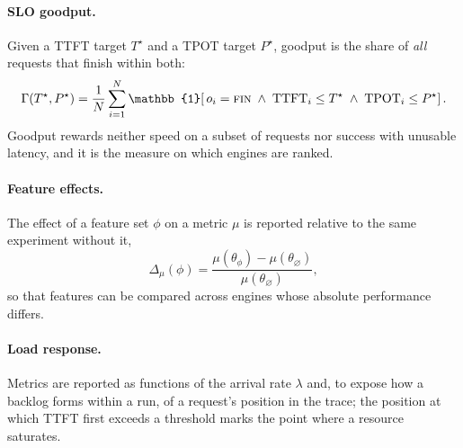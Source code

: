 \paragraph{SLO goodput.}
Given a TTFT target $T^\star$ and a TPOT target $P^\star$, goodput is the share of \emph{all}
requests that finish within both:
\begin{equation}
  \Gamma(T^\star, P^\star) = \frac{1}{N} \sum_{i=1}^{N}
  \mathbb{1}\!\left[\, o_i = \textsc{fin} \;\wedge\; \mathrm{TTFT}_i \le T^\star \;\wedge\;
  \mathrm{TPOT}_i \le P^\star \right].
  \label{eq:goodput}
\end{equation}
Goodput rewards neither speed on a subset of requests nor success with unusable latency, and it is
the measure on which engines are ranked.

\paragraph{Feature effects.}
The effect of a feature set $\phi$ on a metric $\mu$ is reported relative to the same experiment
without it,
\begin{equation}
  \Delta_\mu(\phi) = \frac{\mu(\theta_\phi) - \mu(\theta_\varnothing)}{\mu(\theta_\varnothing)},
  \label{eq:delta}
\end{equation}
so that features can be compared across engines whose absolute performance differs.

\paragraph{Load response.}
Metrics are reported as functions of the arrival rate $\lambda$ and, to expose how a backlog forms
within a run, of a request's position in the trace; the position at which TTFT first exceeds a
threshold marks the point where a resource saturates.
